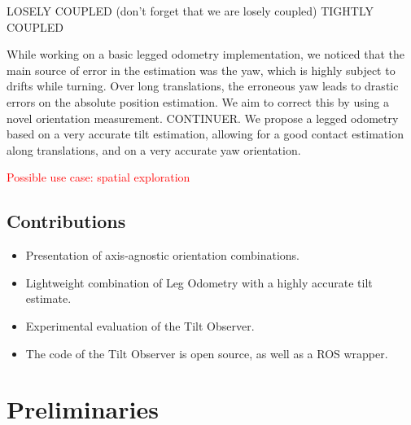 \documentclass{IJCAS}
\begin{document}
    LOSELY COUPLED (don't forget that we are losely coupled)
    TIGHTLY COUPLED

    While working on a basic legged odometry implementation, we noticed that the main source of error in the estimation was the yaw, which is highly subject to drifts while turning. Over long translations, the erroneous yaw leads to drastic errors on the absolute position estimation. We aim to correct this by using a novel orientation measurement. CONTINUER.
    We propose a legged odometry based on a very accurate tilt estimation, allowing for a good contact estimation along translations, and on a very accurate yaw orientation.

    \textcolor{red}{Possible use case: spatial exploration}




\subsection{Contributions}
\begin{itemize}
  \item Presentation of axis-agnostic orientation combinations.
  \item Lightweight combination of Leg Odometry with a highly accurate tilt estimate.
  \item Experimental evaluation of the Tilt Observer.
  \item The code of the Tilt Observer is open source, as well as a ROS wrapper.
\end{itemize}

\section{Preliminaries}
\end{document}
